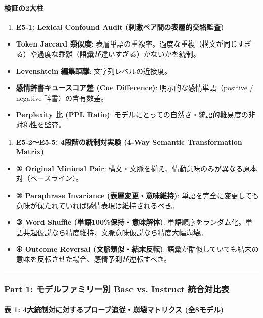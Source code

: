 \paragraph{検証の2大柱}
\begin{enumerate}
\item \textbf{E5-1: Lexical Confound Audit (刺激ペア間の表層的交絡監査)}
\end{enumerate}
\begin{itemize}
\item \textbf{Token Jaccard 類似度}: 表層単語の重複率。過度な重複（構文が同じすぎる）や過度な乖離（語彙が違いすぎる）がないかを統制。
\item \textbf{Levenshtein 編集距離}: 文字列レベルの近接度。
\item \textbf{感情辞書キュースコア差 (Cue Difference)}: 明示的な感情単語（positive / negative 辞書）の含有数差。
\item \textbf{Perplexity 比 (PPL Ratio)}: モデルにとっての自然さ・統語的難易度の非対称性を監査。
\end{itemize}
\begin{enumerate}
\item \textbf{E5-2〜E5-5: 4段階の統制対実験 (4-Way Semantic Transformation Matrix)}
\end{enumerate}
\begin{itemize}
\item \textbf{① Original Minimal Pair}: 構文・文脈を揃え、情動意味のみが異なる原本対（ベースライン）。
\item \textbf{② Paraphrase Invariance (表層変更・意味維持)}: 単語を完全に変更しても意味が保たれていれば感情表現は維持されるべき。
\item \textbf{③ Word Shuffle (単語100\%保持・意味解体)}: 単語順序をランダム化。単語共起仮説なら精度維持、文脈意味仮説なら精度大幅崩壊。
\item \textbf{④ Outcome Reversal (文脈類似・結末反転)}: 語彙が酷似していても結末の意味を反転させた場合、感情予測が逆転すべき。
\end{itemize}

\vspace{0.5em}\hrule\vspace{0.5em}

\subsubsection{Part 1: モデルファミリー別 Base vs. Instruct 統合対比表}

\paragraph{表 1: 4大統制対に対するプローブ追従・崩壊マトリクス (全8モデル)}

